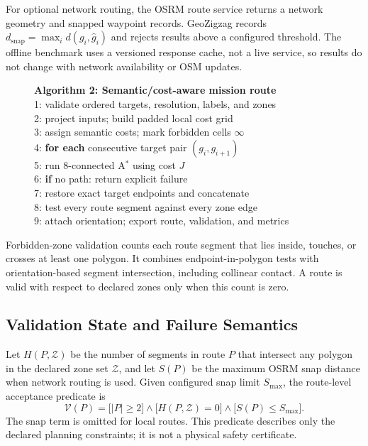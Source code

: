 \documentclass[conference,a4paper]{IEEEtran}
\begin{document}
For optional network routing, the OSRM route service returns a network
geometry and snapped waypoint records. GeoZigzag records
$d_{\mathrm{snap}}=\max_i d(g_i,\hat g_i)$ and rejects results above a
configured threshold. The offline benchmark uses a versioned response cache,
not a live service, so results do not change with network availability or OSM
updates.

\begin{figure}[t]
\footnotesize
\begin{minipage}{0.96\columnwidth}
\textbf{Algorithm 2: Semantic/cost-aware mission route}\\
1: validate ordered targets, resolution, labels, and zones\\
2: project inputs; build padded local cost grid\\
3: assign semantic costs; mark forbidden cells $\infty$\\
4: \textbf{for each} consecutive target pair $(g_i,g_{i+1})$\\
5: \quad run 8-connected A$^\ast$ using cost $J$\\
6: \quad \textbf{if} no path: return explicit failure\\
7: \quad restore exact target endpoints and concatenate\\
8: test every route segment against every zone edge\\
9: attach orientation; export route, validation, and metrics
\end{minipage}
\end{figure}

Forbidden-zone validation counts each route segment that lies inside, touches,
or crosses at least one polygon. It combines endpoint-in-polygon tests with
orientation-based segment intersection, including collinear contact. A route
is valid with respect to declared zones only when this count is zero.

\subsection{Validation State and Failure Semantics}
Let $H(P,\mathcal{Z})$ be the number of segments in route $P$ that intersect
any polygon in the declared zone set $\mathcal{Z}$, and let $S(P)$ be the
maximum OSRM snap distance when network routing is used. Given configured snap
limit $S_{\max}$, the route-level acceptance predicate is
\begin{equation}
\mathcal{V}(P)=\bigl[|P|\geq2\bigr]\land
\bigl[H(P,\mathcal{Z})=0\bigr]\land
\bigl[S(P)\leq S_{\max}\bigr].
\end{equation}
The snap term is omitted for local routes. This predicate describes only the
declared planning constraints; it is not a physical safety certificate.
\end{document}
